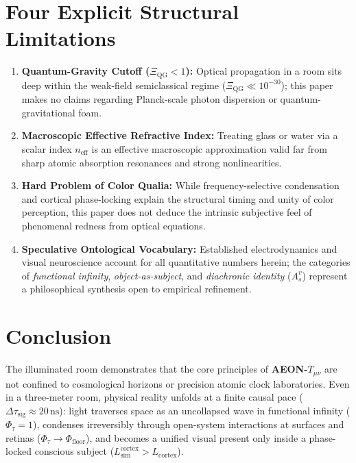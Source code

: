 \documentclass[11pt,a4paper]{article}
\begin{document}
\section{Four Explicit Structural Limitations}

\begin{enumerate}
    \item \textbf{Quantum-Gravity Cutoff ($\Xi_{\mathrm{QG}} < 1$):} Optical propagation in a room sits deep within the weak-field semiclassical regime ($\Xi_{\mathrm{QG}} \ll 10^{-30}$); this paper makes no claims regarding Planck-scale photon dispersion or quantum-gravitational foam.
    \item \textbf{Macroscopic Effective Refractive Index:} Treating glass or water via a scalar index $n_{\mathrm{eff}}$ is an effective macroscopic approximation valid far from sharp atomic absorption resonances and strong nonlinearities.
    \item \textbf{Hard Problem of Color Qualia:} While frequency-selective condensation and cortical phase-locking explain the structural timing and unity of color perception, this paper does not deduce the intrinsic subjective feel of phenomenal redness from optical equations.
    \item \textbf{Speculative Ontological Vocabulary:} Established electrodynamics and visual neuroscience account for all quantitative numbers herein; the categories of \emph{functional infinity}, \emph{object-as-subject}, and \emph{diachronic identity} ($A_s^v$) represent a philosophical synthesis open to empirical refinement.
\end{enumerate}

\section{Conclusion}

The illuminated room demonstrates that the core principles of \textbf{AEON-$T_{\mu\nu}$} are not confined to cosmological horizons or precision atomic clock laboratories. Even in a three-meter room, physical reality unfolds at a finite causal pace ($\Delta\tau_{\mathrm{sig}} \approx 20\,\mathrm{ns}$): light traverses space as an uncollapsed wave in functional infinity ($\Phi_\tau = 1$), condenses irreversibly through open-system interactions at surfaces and retinas ($\Phi_\tau \to \Phi_{\mathrm{floor}}$), and becomes a unified visual present only inside a phase-locked conscious subject ($L_{\mathrm{sim}}^{\mathrm{cortex}} > L_{\mathrm{cortex}}$).
\end{document}
